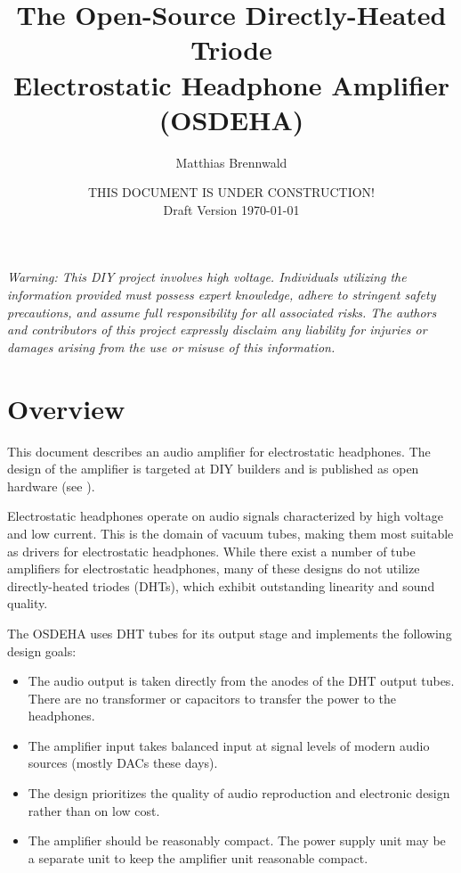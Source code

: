 


\title{The Open-Source Directly-Heated Triode \\ Electrostatic Headphone Amplifier \\ (OSDEHA)}
\author{Matthias Brennwald}
\date{THIS DOCUMENT IS UNDER CONSTRUCTION!\\ Draft Version \today}




\maketitle

\emph{Warning: This DIY project involves high voltage. Individuals utilizing the information provided must possess expert knowledge, adhere to stringent safety precautions, and assume full responsibility for all associated risks. The authors and contributors of this project expressly disclaim any liability for injuries or damages arising from the use or misuse of this information.}

\clearpage

\tableofcontents

\clearpage


\section{Overview}

This document describes an audio amplifier for electrostatic headphones. The design of the amplifier is targeted at DIY builders and is published as open hardware (see ).

Electrostatic headphones operate on audio signals characterized by high voltage and low current. This is the domain of vacuum tubes, making them most suitable as drivers for electrostatic headphones.  While there exist a number of tube amplifiers for electrostatic headphones, many of these designs do not utilize directly-heated triodes (DHTs), which exhibit outstanding linearity and sound quality.\par

The OSDEHA uses DHT tubes for its output stage and implements the following design goals:
\begin{itemize}
\item The audio output is taken directly from the anodes of the DHT output tubes. There are no transformer or capacitors to transfer the power to the headphones.
\item The amplifier input takes balanced input at signal levels of modern audio sources (mostly DACs these days).
\item The design prioritizes the quality of audio reproduction and electronic design rather than on low cost.
\item The amplifier should be reasonably compact. The power supply unit may be a separate unit to keep the amplifier unit reasonable compact.
\end{itemize}


